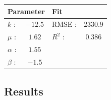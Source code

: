 \documentclass[11pt]{article} %
\begin{document}
\begin{center}
\begin{tabular}{lclc}
 \multicolumn{2}{l}{Parameter} 	& \multicolumn{2}{l}{Fit } \\ \hline	 
 $k$ : 		& $-12.5$ 	& RMSE :	&  $2330.9$	  	\\
 $\mu$ :	& $1.62$	& $R^2$ :	&  	$0.386$  	\\
 $\alpha$ :	& $1.55$	&  			&  	  			\\
 $\beta$ :	& $-1.5$	& 	 		&
\end{tabular}
\label{unconstrained}
\end{center} 


\subsection{Results}

\begin{table}
\tiny
{}
\end{table}

\begin{table}
\tiny
{}
\end{table}

\begin{table}
\tiny
{}
\end{table}
\end{document}
